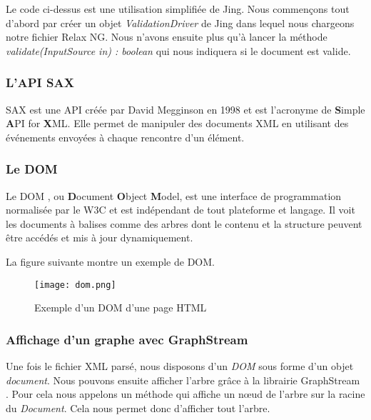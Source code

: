 \par
Le code ci-dessus est une utilisation simplifiée de Jing. Nous commençons tout d'abord par créer un objet \emph{ValidationDriver} de Jing dans lequel nous chargeons notre fichier Relax NG. Nous n'avons ensuite plus qu'à lancer la méthode \emph{validate(InputSource in) : boolean} qui nous indiquera si le document est valide.


\subsubsection{L'API SAX}

SAX \cite{sax_website, sax_oracle} est une API créée par David Megginson en 1998 et est l'acronyme de \textbf{S}imple \textbf{A}PI for \textbf{X}ML. Elle permet de manipuler des documents XML en utilisant des événements envoyées à chaque rencontre d'un élément.


\subsubsection{Le DOM}

Le DOM \cite{dom_w3c} , ou \textbf{D}ocument \textbf{O}bject \textbf{M}odel, est une interface de programmation normalisée par le W3C et est indépendant de tout plateforme et langage. Il voit les documents à balises comme des arbres dont le contenu et la structure peuvent être accédés et mis à jour dynamiquement.

\par
La figure suivante montre un exemple de DOM.

\begin{figure}[!h]
\centering
\texttt{[image: dom.png]}\\[1cm]
\caption{Exemple d'un DOM d'une page HTML}
\end{figure}


\subsubsection{Affichage d'un graphe avec GraphStream}

Une fois le fichier XML parsé, nous disposons d'un \emph{DOM} sous forme d'un objet \emph{document}. Nous pouvons ensuite afficher l'arbre grâce à la librairie GraphStream \cite{graphstream}. Pour cela nous appelons un méthode qui affiche un nœud de l'arbre sur la racine du \emph{Document}. Cela nous permet donc d'afficher tout l'arbre.

